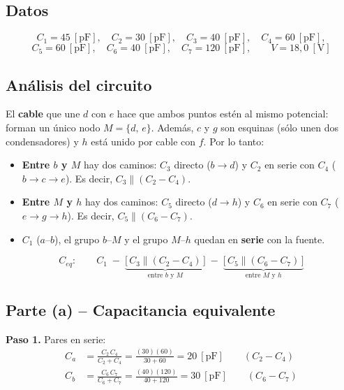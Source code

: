 \documentclass[12pt,letterpaper]{article}
\begin{document}
\subsection*{Datos}

\[
    C_1 = 45\ [\text{pF}],\quad C_2 = 30\ [\text{pF}],\quad C_3 = 40\ [\text{pF}],\quad
    C_4 = 60\ [\text{pF}],
\]
\[
    C_5 = 60\ [\text{pF}],\quad C_6 = 40\ [\text{pF}],\quad C_7 = 120\ [\text{pF}],\qquad
    V = 18{,}0\ [\text{V}]
\]

\subsection*{An\'alisis del circuito}

El \textbf{cable} que une $d$ con $e$ hace que ambos puntos est\'en al mismo potencial: forman un
\'unico nodo $M = \{d,\,e\}$. Adem\'as, $c$ y $g$ son esquinas (s\'olo unen dos condensadores) y
$h$ est\'a unido por cable con $f$. Por lo tanto:
\begin{itemize}\setlength\itemsep{1pt}
    \item \textbf{Entre $b$ y $M$} hay dos caminos: $C_3$ directo ($b\to d$) y $C_2$ en serie con
          $C_4$ ($b\to c\to e$). Es decir, $C_3 \parallel (C_2 - C_4)$.
    \item \textbf{Entre $M$ y $h$} hay dos caminos: $C_5$ directo ($d\to h$) y $C_6$ en serie con
          $C_7$ ($e\to g\to h$). Es decir, $C_5 \parallel (C_6 - C_7)$.
    \item $C_1$ ($a$--$b$), el grupo $b$--$M$ y el grupo $M$--$h$ quedan en \textbf{serie} con la
          fuente.
\end{itemize}
\[
    C_{eq}:\qquad C_1 \;-\; \underbrace{\bigl[\,C_3 \parallel (C_2 - C_4)\,\bigr]}_{\text{entre } b \text{ y } M}
    \;-\; \underbrace{\bigl[\,C_5 \parallel (C_6 - C_7)\,\bigr]}_{\text{entre } M \text{ y } h}
\]

\subsection*{Parte (a) -- Capacitancia equivalente}

\textbf{Paso 1.} Pares en serie:
\begin{align*}
    C_a &= \frac{C_2\,C_4}{C_2 + C_4} = \frac{(30)(60)}{30 + 60} = 20\ [\text{pF}]
          \qquad(C_2 - C_4)\\[4pt]
    C_b &= \frac{C_6\,C_7}{C_6 + C_7} = \frac{(40)(120)}{40 + 120} = 30\ [\text{pF}]
          \qquad(C_6 - C_7)
\end{align*}
\end{document}
